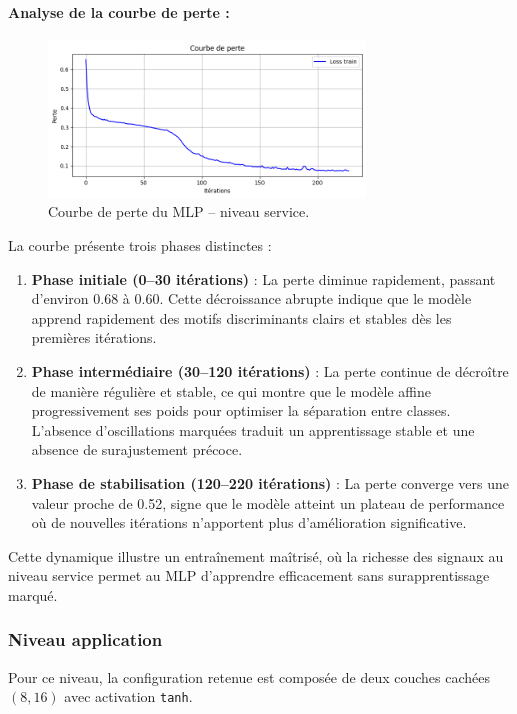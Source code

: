 \documentclass[a4paper,12pt]{report}
\begin{document}
\paragraph{Analyse de la courbe de perte :}
\begin{figure}[H]
    \centering
    \includegraphics[width=0.75\textwidth]{images/loss_curve_mlp_service.png}
    \caption{Courbe de perte du MLP – niveau service.}
\end{figure}

La courbe présente trois phases distinctes :
\begin{enumerate}
    \item \textbf{Phase initiale (0–30 itérations)} : La perte diminue rapidement, passant d'environ 0.68 à 0.60. Cette décroissance abrupte indique que le modèle apprend rapidement des motifs discriminants clairs et stables dès les premières itérations.
    \item \textbf{Phase intermédiaire (30–120 itérations)} : La perte continue de décroître de manière régulière et stable, ce qui montre que le modèle affine progressivement ses poids pour optimiser la séparation entre classes. L’absence d’oscillations marquées traduit un apprentissage stable et une absence de surajustement précoce.
    \item \textbf{Phase de stabilisation (120–220 itérations)} : La perte converge vers une valeur proche de 0.52, signe que le modèle atteint un plateau de performance où de nouvelles itérations n'apportent plus d’amélioration significative.
\end{enumerate}
Cette dynamique illustre un entraînement maîtrisé, où la richesse des signaux au niveau service permet au MLP d’apprendre efficacement sans surapprentissage marqué.

\subsubsection*{Niveau application}

Pour ce niveau, la configuration retenue est composée de deux couches cachées $(8, 16)$ avec activation \texttt{tanh}.
\end{document}
